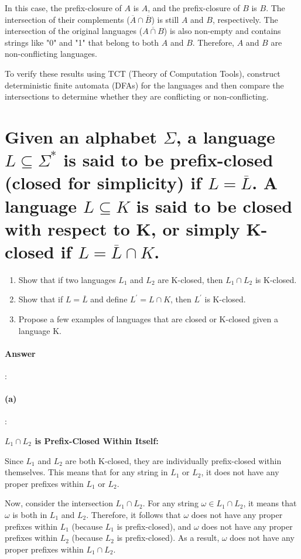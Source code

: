 \documentclass{article}
\begin{document}
In this case, the prefix-closure of $A$ is $A$, and the prefix-closure of $B$ is $B$. The intersection of their complements ($\overline{A} \cap \overline{B}$) is still $A$ and $B$, respectively. The intersection of the original languages ($\overline{A \cap B}$) is also non-empty and contains strings like "0" and "1" that belong to both $A$ and $B$. Therefore, $A$ and $B$ are non-conflicting languages.

To verify these results using TCT (Theory of Computation Tools), construct deterministic finite automata (DFAs) for the languages and then compare the intersections to determine whether they are conflicting or non-conflicting.

\section{Given an alphabet $\Sigma$, a language $L \subseteq  \Sigma^*$ is said to be prefix-closed (closed for simplicity) if $L = \overline{L}$. A language $L \subseteq  K$ is said to be closed with respect to K, or simply K-closed if $L = \overline{L} \cap K$.}

\begin{enumerate}[label=(\alph*)]
  \item Show that if two languages $L_1$ and $L_2$ are K-closed, then $L_1 \cap L_2$ is K-closed.
  \item Show that if $L = \overline{L}$ and define $L^\prime  = L \cap K$, then $L^\prime$ is K-closed.
  \item Propose a few examples of languages that are closed or K-closed given a language K.
\end{enumerate}

\paragraph{Answer}:

\paragraph{(a)}:

\textbf{$L_1 \cap L_2$ is Prefix-Closed Within Itself:}

Since $L_1$ and $L_2$ are both K-closed, they are individually prefix-closed within themselves. This means that for any string in $L_1$ or $L_2$, it does not have any proper prefixes within $L_1$ or $L_2$.

Now, consider the intersection $L_1 \cap L_2$. For any string $\omega \in L_1 \cap L_2$, it means that $\omega$ is both in $L_1$ and $L_2$. Therefore, it follows that $\omega$ does not have any proper prefixes within $L_1$ (because $L_1$ is prefix-closed), and $\omega$ does not have any proper prefixes within $L_2$ (because $L_2$ is prefix-closed). As a result, $\omega$ does not have any proper prefixes within $L_1 \cap L_2$.
\end{document}
